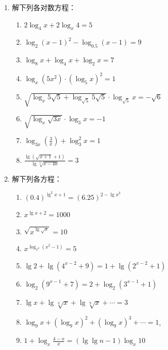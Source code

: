 \begin{enumerate}
\item 解下列各对数方程：
  \begin{enumerate}
  \item  $2 \log _{4} x+2 \log _{x} 4=5$ 
  \item  $\log _{2}(x-1)^{2}-\log _{0.5}(x-1)=9$
  \item  $\log _{8} x+\log _{4} x+\log _{2} x=7$
  \item  $\log _{x}\left(5 x^{2}\right) \cdot\left(\log _{5} x\right)^{2}=1$
  \item  $\sqrt{\log _{x} 5 \sqrt{5}+\log _{\sqrt{5}} 5 \sqrt{5}} \cdot \log _{\sqrt{5}} x=-\sqrt{6}$
  \item  $\sqrt{\log _{x} \sqrt{3 x}} \cdot \log _{3} x=-1$
  \item  $\log _{3 x}\left(\frac{3}{x}\right)+\log _{3}^{2} x=1$
  \item $\frac{\lg\left(\sqrt{x+1}+1\right)}{\lg\sqrt[3]{x-40}}=3$
  \end{enumerate}

  \item 解下列各方程：
\begin{enumerate}
  \item $(0.4)^{\lg^2 x+1}=(6.25)^{2-\lg x^3}$
  \item $x^{\lg x+2}=1000$
  \item $\sqrt{x^{\lg \sqrt{x}}}=10$
  \item $x^{\log_{x^2}(x^2-1)}=5$
\item $\lg 2+\lg \left(4^{x-2}+9\right)=1+\lg \left(2^{x-2}+1\right)$
\item $\log _{2}\left(9^{x-1}+7\right)=2+\log _{2}\left(3^{x-1}+1\right)$
\item $\lg x+\lg \sqrt[3]{x}+\lg  \sqrt[9]{x}+\cdots=3$
\item $\log _{9} x+\left(\log _{9} x\right)^{2}+\left(\log _{9} x\right)^{3}+\cdots=1$,
\item $ 1+\log _{x} \frac{4-x}{x}=(\lg\lg n-1) \log _{x} 10$
\end{enumerate}


\end{enumerate}
